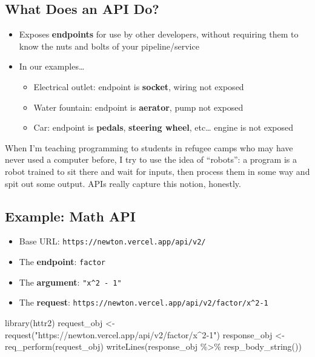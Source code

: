 \documentclass[
  letterpaper,
  DIV=11,
  numbers=noendperiod,
  oneside]{scrreprt}
\newenvironment{Shaded}{\begin{snugshade}}{\end{snugshade}}
\newcommand{\FunctionTok}[1]{\textcolor[rgb]{0.28,0.35,0.67}{#1}}
\newcommand{\NormalTok}[1]{\textcolor[rgb]{0.00,0.23,0.31}{#1}}
\newcommand{\OtherTok}[1]{\textcolor[rgb]{0.00,0.23,0.31}{#1}}
\newcommand{\SpecialCharTok}[1]{\textcolor[rgb]{0.37,0.37,0.37}{#1}}
\newcommand{\StringTok}[1]{\textcolor[rgb]{0.13,0.47,0.30}{#1}}
\providecommand{\tightlist}{%
  \setlength{\itemsep}{0pt}\setlength{\parskip}{0pt}}\usepackage{longtable,booktabs,array}
\begin{document}
\hypertarget{what-does-an-api-do}{%
\subsection{What Does an API Do?}\label{what-does-an-api-do}}

\begin{itemize}
\tightlist
\item
  Exposes \textbf{endpoints} for use by other developers, without
  requiring them to know the nuts and bolts of your pipeline/service
\item
  In our examples\ldots{}

  \begin{itemize}
  \tightlist
  \item
    Electrical outlet: endpoint is \textbf{socket}, wiring not exposed
  \item
    Water fountain: endpoint is \textbf{aerator}, pump not exposed
  \item
    Car: endpoint is \textbf{pedals}, \textbf{steering wheel},
    etc\ldots{} engine is not exposed
  \end{itemize}
\end{itemize}

When I'm teaching programming to students in refugee camps who may have
never used a computer before, I try to use the idea of ``robots'': a
program is a robot trained to sit there and wait for inputs, then
process them in some way and spit out some output. APIs really capture
this notion, honestly.

\hypertarget{example-math-api}{%
\subsection{Example: Math API}\label{example-math-api}}

\begin{itemize}
\tightlist
\item
  Base URL: \texttt{https://newton.vercel.app/api/v2/}
\item
  The \textbf{endpoint}: \texttt{factor}
\item
  The \textbf{argument}: \texttt{"x\^{}2\ -\ 1"}
\item
  The \textbf{request}:
  \texttt{https://newton.vercel.app/api/v2/factor/x\^{}2-1}
\end{itemize}

\begin{Shaded}
\begin{Highlighting}[]
\FunctionTok{library}\NormalTok{(httr2)}
\NormalTok{request\_obj }\OtherTok{\textless{}{-}} \FunctionTok{request}\NormalTok{(}\StringTok{"https://newton.vercel.app/api/v2/factor/x\^{}2{-}1"}\NormalTok{)}
\NormalTok{response\_obj }\OtherTok{\textless{}{-}} \FunctionTok{req\_perform}\NormalTok{(request\_obj)}
\FunctionTok{writeLines}\NormalTok{(response\_obj }\SpecialCharTok{\%\textgreater{}\%} \FunctionTok{resp\_body\_string}\NormalTok{())}
\end{Highlighting}
\end{Shaded}
\end{document}
